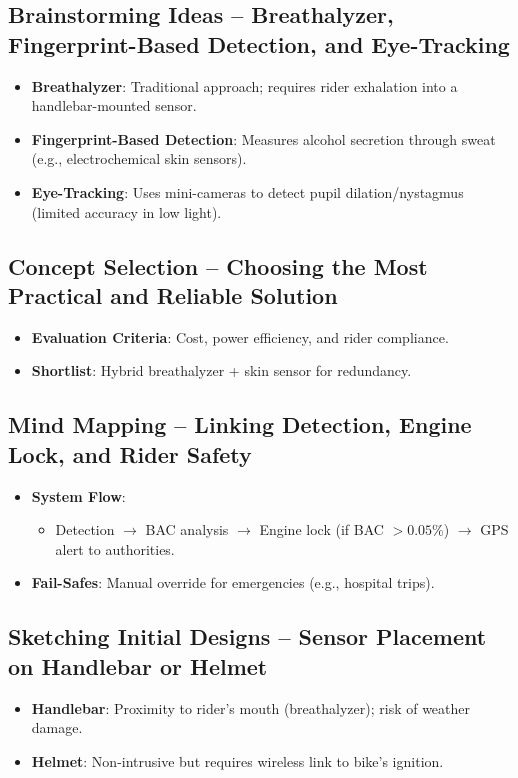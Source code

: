 \documentclass{article}
\begin{document}
\subsection{Brainstorming Ideas -- Breathalyzer, Fingerprint-Based Detection, and Eye-Tracking}
\begin{itemize}
    \item \textbf{Breathalyzer}: Traditional approach; requires rider exhalation into a handlebar-mounted sensor.
    \item \textbf{Fingerprint-Based Detection}: Measures alcohol secretion through sweat (e.g., electrochemical skin sensors).
    \item \textbf{Eye-Tracking}: Uses mini-cameras to detect pupil dilation/nystagmus (limited accuracy in low light).
\end{itemize}

\subsection{Concept Selection -- Choosing the Most Practical and Reliable Solution}
\begin{itemize}
    \item \textbf{Evaluation Criteria}: Cost, power efficiency, and rider compliance.
    \item \textbf{Shortlist}: Hybrid breathalyzer + skin sensor for redundancy.
\end{itemize}

\subsection{Mind Mapping -- Linking Detection, Engine Lock, and Rider Safety}
\begin{itemize}
    \item \textbf{System Flow}: 
    \begin{itemize}
        \item Detection $\rightarrow$ BAC analysis $\rightarrow$ Engine lock (if BAC $>0.05\%$) $\rightarrow$ GPS alert to authorities.
    \end{itemize}
    \item \textbf{Fail-Safes}: Manual override for emergencies (e.g., hospital trips).
\end{itemize}

\subsection{Sketching Initial Designs -- Sensor Placement on Handlebar or Helmet}
\begin{itemize}
    \item \textbf{Handlebar}: Proximity to rider’s mouth (breathalyzer); risk of weather damage.
    \item \textbf{Helmet}: Non-intrusive but requires wireless link to bike’s ignition.
\end{itemize}
\end{document}
